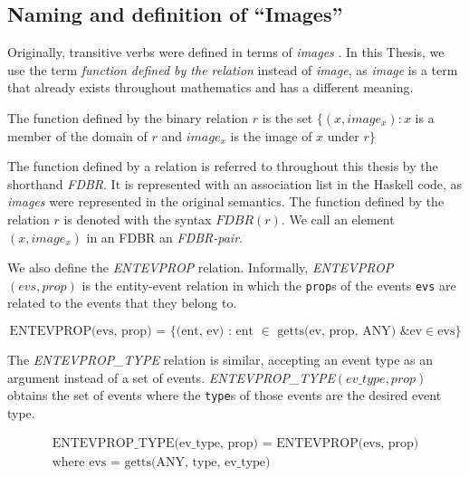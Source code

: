 \documentclass[../main.tex]{subfiles}
\begin{document}
\subsection{Naming and definition of ``Images''}

Originally, transitive verbs were defined in terms of {\em images} \cite{frost2014denotational}.
In this Thesis, we use the term {\em function defined by the relation} instead of {\em image}, as {\em image} is a term that already exists throughout mathematics and has
a different meaning.

\begin{definition}
	The function defined by the binary relation $r$ is the set $\{(x, image_x) : x $ is a member of the domain of $r$ and $image_x$ is the image of $x$ under $r\}$
\end{definition}

The function defined by a relation is referred to throughout this thesis by the shorthand {\em FDBR}.  It is represented with an association list in the Haskell code,
as {\em images} were represented in the original semantics.  The function defined by the relation $r$ is denoted with the syntax $FDBR(r)$.
We call an element $(x, image_x)$ in an FDBR an {\em FDBR-pair}.

We also define the {\em ENTEVPROP} relation.  Informally, {\em ENTEVPROP}$(evs, prop)$ is the entity-event relation in which the \texttt{prop}s of the events \texttt{evs} are related to the events that they belong to.

\begin{definition}
	\[\text{ENTEVPROP(evs, prop) = }\{\text{(ent, ev) : ent } \in \text{ getts(ev, prop, ANY) \& ev} \in \text{evs} \}\]
\end{definition}

The {\em ENTEVPROP\_TYPE} relation is similar, accepting an event type as an argument instead of a set of events.
{\em ENTEVPROP\_TYPE}$(ev\_type, prop)$ obtains the set of events where the \texttt{type}s of those events are the desired event type.


\begin{definition}
	\begin{multline}
	\text{ENTEVPROP\_TYPE(ev\_type, prop) = ENTEVPROP(evs, prop)} \\ \text{where evs = getts(ANY, type, ev\_type)}
	\end{multline}
\end{definition}
\end{document}
